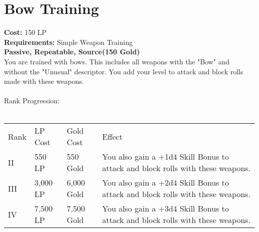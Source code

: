 \section{Bow Training}\label{perk:bowTraining}
\textbf{Cost:} 150 LP\\
\textbf{Requirements:} Simple Weapon Training\\
\textbf{Passive, Repeatable, Source(150 Gold)}\\
You are trained with bows.
This includes all weapons with the "Bow" and without the "Unusual" descriptor.
You add your level to attack and block rolls made with these weapons.\\
\\
Rank Progression:\\
\\
\begin{longtable}{l | l | l | p{9cm}}
	Rank & LP Cost & Gold Cost & Effect\\
	II & 550 LP & 550 Gold & You also gain a +1d4 Skill Bonus to attack and block rolls with these weapons.\\
	III & 3,000 LP & 6,000 Gold & You also gain a +2d4 Skill Bonus to attack and block rolls with these weapons.\\
	IV & 7,500 LP & 7,500 Gold & You also gain a +3d4 Skill Bonus to attack and block rolls with these weapons.\\
\end{longtable}